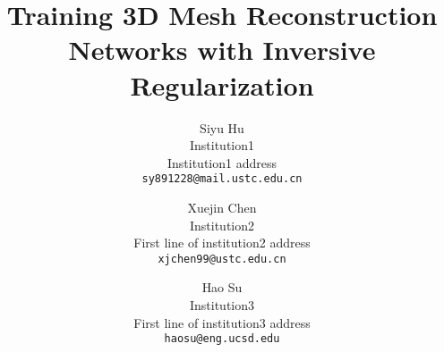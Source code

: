 \documentclass[10pt,twocolumn,letterpaper]{article}
\begin{document}
\title{Training 3D Mesh Reconstruction Networks with Inversive Regularization}

\author{Siyu Hu\\
Institution1\\
Institution1 address\\
{\tt\small sy891228@mail.ustc.edu.cn}
\and
Xuejin Chen\\
Institution2\\
First line of institution2 address\\
{\tt\small xjchen99@ustc.edu.cn}
\and 
Hao Su\\
Institution3\\
First line of institution3 address\\
{\tt\small haosu@eng.ucsd.edu}
}

\maketitle
 





{\small


}

\end{document}
